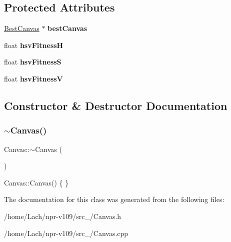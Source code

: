 \subsection*{Protected Attributes}
\begin{DoxyCompactItemize}
\item 
\hypertarget{classCanvas_a93c8956f408b11c81073f5d748a8e3b3}{}\label{classCanvas_a93c8956f408b11c81073f5d748a8e3b3} 
\hyperlink{classBestCanvas}{Best\+Canvas} $\ast$ {\bfseries best\+Canvas}
\item 
\hypertarget{classCanvas_aeff1549bc9fb9469f68227dbbee4a4de}{}\label{classCanvas_aeff1549bc9fb9469f68227dbbee4a4de} 
float {\bfseries hsv\+FitnessH}
\item 
\hypertarget{classCanvas_af04ba6d3e079fa937575f7ef80bfac6d}{}\label{classCanvas_af04ba6d3e079fa937575f7ef80bfac6d} 
float {\bfseries hsv\+FitnessS}
\item 
\hypertarget{classCanvas_a16bfdb1b384498d5aa0cbd674c6abfe4}{}\label{classCanvas_a16bfdb1b384498d5aa0cbd674c6abfe4} 
float {\bfseries hsv\+FitnessV}
\end{DoxyCompactItemize}


\subsection{Constructor \& Destructor Documentation}
\hypertarget{classCanvas_a237c4549ad2e27c729cd1f71e89f0fd9}{}\label{classCanvas_a237c4549ad2e27c729cd1f71e89f0fd9} 
\subsubsection{\texorpdfstring{$\sim$\+Canvas()}{~Canvas()}}
{\footnotesize\ttfamily Canvas\+::$\sim$\+Canvas (\begin{DoxyParamCaption}{ }\end{DoxyParamCaption})\hspace{0.3cm}{\ttfamily [virtual]}}

Canvas\+::\+Canvas() \{ \} 

The documentation for this class was generated from the following files\+:\begin{DoxyCompactItemize}
\item 
/home/\+Lach/npr-\/v109/src\+\_/Canvas.\+h\item 
/home/\+Lach/npr-\/v109/src\+\_/Canvas.\+cpp\end{DoxyCompactItemize}
